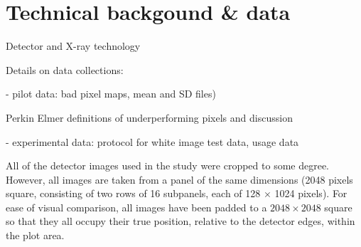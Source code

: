 \documentclass[\main/IO-Pixels.tex]{subfiles}
\begin{document}
\section{Technical backgound \& data}
\begin{outline}
Detector and X-ray technology

Details on data collections: 

- pilot data: bad pixel maps, mean and SD files)

  Perkin Elmer definitions of underperforming pixels and discussion
  
- experimental data: protocol for white image test data, usage data
\end{outline}

All of the detector images used in the study were cropped to some degree. However, all images are taken from a panel of the same dimensions (2048 pixels square, consisting of two rows of 16 subpanels, each of 128 $\times$ 1024 pixels). For ease of visual comparison, all images have been padded to a $2048 \times 2048$ square so that they all occupy their true position, relative to the detector edges, within the plot area.
  
\end{document}
